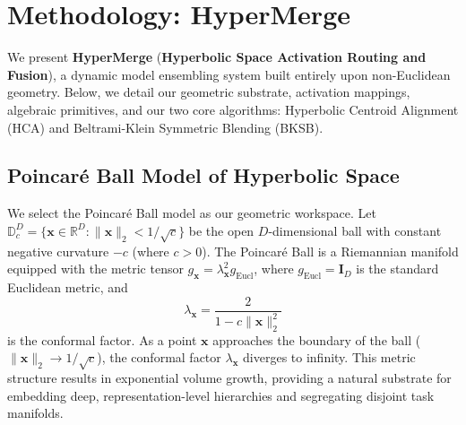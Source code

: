 \section{Methodology: HyperMerge}
\label{sec:methodology}

We present \textbf{HyperMerge} (\textbf{Hyperbolic Space Activation Routing and Fusion}), a dynamic model ensembling system built entirely upon non-Euclidean geometry. Below, we detail our geometric substrate, activation mappings, algebraic primitives, and our two core algorithms: Hyperbolic Centroid Alignment (HCA) and Beltrami-Klein Symmetric Blending (BKSB).

\subsection{Poincaré Ball Model of Hyperbolic Space}
We select the Poincaré Ball model as our geometric workspace. Let $\mathbb{D}_c^D = \{\mathbf{x} \in \mathbb{R}^D : \|\mathbf{x}\|_2 < 1 / \sqrt{c}\}$ be the open $D$-dimensional ball with constant negative curvature $-c$ (where $c > 0$). The Poincaré Ball is a Riemannian manifold equipped with the metric tensor $g_{\mathbf{x}} = \lambda_{\mathbf{x}}^2 g_{\text{Eucl}}$, where $g_{\text{Eucl}} = \mathbf{I}_D$ is the standard Euclidean metric, and
\begin{equation}
\lambda_{\mathbf{x}} = \frac{2}{1 - c\|\mathbf{x}\|_2^2}
\end{equation}
is the conformal factor. As a point $\mathbf{x}$ approaches the boundary of the ball ($\|\mathbf{x}\|_2 \to 1/\sqrt{c}$), the conformal factor $\lambda_{\mathbf{x}}$ diverges to infinity. This metric structure results in exponential volume growth, providing a natural substrate for embedding deep, representation-level hierarchies and segregating disjoint task manifolds.

